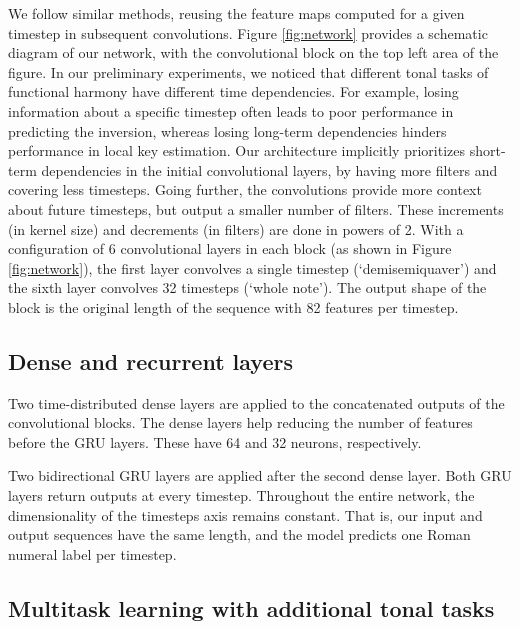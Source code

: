 We follow similar methods, reusing the feature maps computed for a given timestep in subsequent convolutions. 
Figure \ref{fig:network} provides a schematic diagram of our network, with the convolutional block on the top left area of the figure. 
In our preliminary experiments, we noticed that different tonal tasks of functional harmony have different time dependencies. 
For example, losing information about a specific timestep often leads to poor performance in predicting the inversion, whereas losing long-term dependencies hinders performance in local key estimation. 
Our architecture implicitly prioritizes short-term dependencies in the initial convolutional layers, by having more filters and covering less timesteps. Going further, the convolutions provide more context about future timesteps, but output a smaller number of filters. These increments (in kernel size) and decrements (in filters) are done in powers of 2. With a configuration of 6 convolutional layers in each block (as shown in Figure \ref{fig:network}), the first layer convolves a single timestep (`demisemiquaver') and the sixth layer convolves 32 timesteps (`whole note'). The output shape of the block is the original length of the sequence with 82 features per timestep.

\subsection{Dense and recurrent layers}

Two time-distributed dense layers are applied to the concatenated outputs of the convolutional blocks. The dense layers help reducing the number of features before the GRU layers. These have 64 and 32 neurons, respectively. 

Two bidirectional GRU \cite{cho_learning_2014} layers are applied after the second dense layer. 
Both GRU layers return outputs at every timestep. 
Throughout the entire network, the dimensionality of the timesteps axis remains constant. That is, our input and output sequences have the same length, and the model predicts one Roman numeral label per timestep. 

\subsection{Multitask learning with additional tonal tasks}

